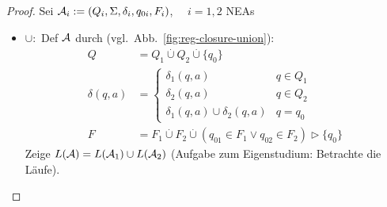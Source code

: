 \begin{proof}
	Sei $\mathcal{A}_i:=(Q_i,\Sigma,\delta_i,q_{0i},F_i)$, $\quad i=1,2$ \acs{NEA}s
	\begin{itemize}
	\item $\cup:$ Def $\mathcal{A}$ durch (vgl.\ Abb.~\ref{fig:reg-closure-union}):
		\begin{align*}
			Q &= Q_1\overset.\cup Q_2\overset.\cup\{q_0\}\\
			\delta(q,a) &=
                \begin{cases}
                    \delta_1(q,a) & q\in Q_1\\
                    \delta_2(q,a) & q\in Q_2\\
                    \delta_1(q,a)\cup\delta_2(q,a) & q=q_0
                        \end{cases}\\
                        F &= F_1\overset.\cup F_2\overset.\cup (q_{01}\in F_1\lor q_{02}\in F_2) \rhd \{q_0\}
                \end{align*}
                Zeige $L(\mathcal{A})=L(\mathcal{A}_1)\cup L(\mathcal{A}_2)$ (Aufgabe zum Eigenstudium: Betrachte die Läufe).
                \begin{figure}[tp]\centering
\end{figure}
\end{itemize}
\end{proof}
